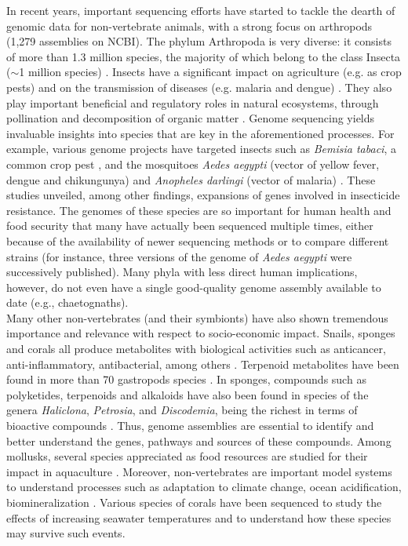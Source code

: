 In recent years, important sequencing efforts have started to tackle the dearth of genomic data for non-vertebrate animals, with a strong focus on arthropods (1,279 assemblies on NCBI). The phylum Arthropoda is very diverse: it consists of more than 1.3 million species, the majority of which belong to the class Insecta ($\sim$1 million species) \cite{Zhang2013}. Insects have a significant impact on agriculture (e.g. as crop pests) and on the transmission of diseases (e.g. malaria and dengue) \cite{li2019}. They also play important beneficial and regulatory roles in natural ecosystems, through pollination and decomposition of organic matter \cite{noriega2018}. Genome sequencing yields invaluable insights into species that are key in the aforementioned processes. For example, various genome projects have targeted insects such as \textit{Bemisia tabaci}, a common crop pest \cite{chen2016}, and the mosquitoes \textit{Aedes aegypti} (vector of yellow fever, dengue and chikungunya) \cite{aedes_aegypti3} and \textit{Anopheles darlingi} (vector of malaria) \cite{marinotti2013}. These studies unveiled, among other findings, expansions of genes involved in insecticide resistance. The genomes of these species are so important for human health and food security that many have actually been sequenced multiple times, either because of the availability of newer sequencing methods or to compare different strains (for instance, three versions of the genome of \textit{Aedes aegypti} \cite{aedes_aegypti, 3d-dna, aedes_aegypti3} were successively published). Many phyla with less direct human implications, however, do not even have a single good-quality genome assembly available to date (e.g., chaetognaths). \\ 

Many other non-vertebrates (and their symbionts) have also shown tremendous importance and relevance with respect to socio-economic impact. Snails, sponges and corals all produce metabolites with biological activities such as anticancer, anti-inflammatory, antibacterial, among others \cite{carroll2021, khalifa2019, ng2015}. Terpenoid metabolites have been found in more than 70 gastropods species \cite{avila2020}. In sponges, compounds such as polyketides, terpenoids and alkaloids have also been found in species of the genera \textit{Haliclona}, \textit{Petrosia}, and \textit{Discodemia}, being the richest in terms of bioactive compounds \cite{Han2019}. Thus, genome assemblies are essential to identify and better understand the genes, pathways and sources of these compounds. Among mollusks, several species appreciated as food resources are studied for their impact in aquaculture \cite{takeuchi2017}. Moreover, non-vertebrates are important model systems to understand processes such as adaptation to climate change, ocean acidification, biomineralization \cite{prather2013, gomes2020, conci2021, clark2020}. Various species of corals \cite{shinzato2011, mao2018, fuller2020, shinzato2021} have been sequenced to study the effects of increasing seawater temperatures and to understand how these species may survive such events.  \\

